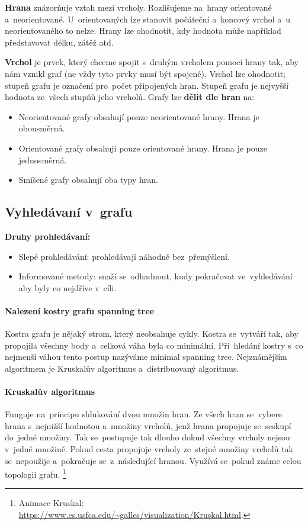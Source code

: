 \textbf{Hrana} znázorňuje vztah mezi vrcholy. Rozlišujeme na~hrany orientované a~neorientované. U~orientovaných lze stanovit počáteční a~koncový vrchol a~u neorientovaného to nelze. Hrany lze ohodnotit, kdy hodnota může například představovat délku, zátěž atd.

\textbf{Vrchol} je prvek, který chceme spojit s~druhým vrcholem pomocí hrany tak, aby nám vznikl graf (ne vždy tyto prvky musí být spojené). Vrchol lze ohodnotit; stupeň grafu je označení pro~počet připojených hran. Stupeň grafu je nejvyšší hodnota ze~všech stupňů jeho vrcholů. Grafy lze \textbf{dělit dle hran} na:

\begin{itemize}
	\item Neorientované grafy obsahují pouze neorientované hrany. Hrana je obousměrná.
	\item Orientované grafy obsahují pouze orientované hrany. Hrana je pouze jednosměrná.
	\item Smíšené grafy obsahují oba typy hran.
\end{itemize}

\subsection{Vyhledávaní v~grafu}

\textbf{Druhy prohledávaní:}
\begin{itemize}
	\item Slepé prohledávání: prohledávají náhodně bez~přemýšlení.
	\item Informované metody: snaží se~odhadnout, kudy pokračovat ve~vyhledávání aby byly co nejdříve v~cíli.
\end{itemize}

\paragraph{Nalezení kostry grafu spanning tree} Kostra grafu je nějaký strom, který neobsahuje cykly. Kostra se~vytváří tak, aby propojila všechny body a~celková váha byla co minimální. Při~hledání kostry s~co nejmenší váhou tento postup nazýváme minimal spanning tree. Nejznámějším algoritmem je Kruskalův algoritmus a~distribuovaný algoritmus.

\paragraph{Kruskalův algoritmus} Funguje na~principu shlukování dvou množin hran. Ze všech hran se~vybere hrana s~nejnižší hodnotou a~množiny vrcholů, jenž hrana propojuje se~seskupí do~jedné množiny. Tak se~postupuje tak dlouho dokud všechny vrcholy nejsou v~jedné množině. Pokud cesta propojuje vrcholy ze~stejné množiny vrcholů tak se~nepoužije a~pokračuje se~z~následující hranou. Využívá se~pokud známe celou topologii grafu.%
\footnote{Animace Kruskal: \url{https://www.cs.usfca.edu/~galles/visualization/Kruskal.html}.}

